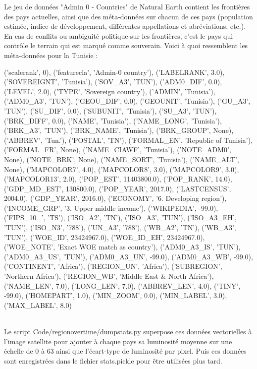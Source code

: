 \documentclass[a4paper]{report}
\begin{document}
Le jeu de données "Admin 0 - Countries" de Natural Earth \cite{naturalearthdata} contient les frontières des pays actuelles, ainsi que des méta-données sur chacun de ces pays (population estimée, indice de développement, différentes appellations et abréviations, etc.). En cas de conflits ou ambiguité politique sur les frontières, c'est le pays qui contrôle le terrain qui est marqué comme souverain. Voici à quoi ressemblent les méta-données pour la Tunisie :\\
\begin{minipage}[t]{1.0\textwidth}
			{('scalerank', 0), ('featurecla', 'Admin-0 country'), ('LABELRANK', 3.0), ('SOVEREIGNT', 'Tunisia'), ('SOV\_A3', 'TUN'), ('ADM0\_DIF', 0.0), ('LEVEL', 2.0), ('TYPE', 'Sovereign country'), ('ADMIN', 'Tunisia'), ('ADM0\_A3', 'TUN'), ('GEOU\_DIF', 0.0), ('GEOUNIT', 'Tunisia'), ('GU\_A3', 'TUN'), ('SU\_DIF', 0.0), ('SUBUNIT', 'Tunisia'), ('SU\_A3', 'TUN'), ('BRK\_DIFF', 0.0), ('NAME', 'Tunisia'), ('NAME\_LONG', 'Tunisia'), ('BRK\_A3', 'TUN'), ('BRK\_NAME', 'Tunisia'), ('BRK\_GROUP', None), ('ABBREV', 'Tun.'), ('POSTAL', 'TN'), ('FORMAL\_EN', 'Republic of Tunisia'), ('FORMAL\_FR', None), ('NAME\_CIAWF', 'Tunisia'), ('NOTE\_ADM0', None), ('NOTE\_BRK', None), ('NAME\_SORT', 'Tunisia'), ('NAME\_ALT', None), ('MAPCOLOR7', 4.0), ('MAPCOLOR8', 3.0), ('MAPCOLOR9', 3.0), ('MAPCOLOR13', 2.0), ('POP\_EST', 11403800.0), ('POP\_RANK', 14.0), ('GDP\_MD\_EST', 130800.0), ('POP\_YEAR', 2017.0), ('LASTCENSUS', 2004.0), ('GDP\_YEAR', 2016.0), ('ECONOMY', '6. Developing region'), ('INCOME\_GRP', '3. Upper middle income'), ('WIKIPEDIA', -99.0), ('FIPS\_10\_', 'TS'), ('ISO\_A2', 'TN'), ('ISO\_A3', 'TUN'), ('ISO\_A3\_EH', 'TUN'), ('ISO\_N3', '788'), ('UN\_A3', '788'), ('WB\_A2', 'TN'), ('WB\_A3', 'TUN'), ('WOE\_ID', 23424967.0), ('WOE\_ID\_EH', 23424967.0), ('WOE\_NOTE', 'Exact WOE match as country'), ('ADM0\_A3\_IS', 'TUN'), ('ADM0\_A3\_US', 'TUN'), ('ADM0\_A3\_UN', -99.0), ('ADM0\_A3\_WB', -99.0),	 ('CONTINENT', 'Africa'), ('REGION\_UN', 'Africa'), ('SUBREGION', 'Northern Africa'), ('REGION\_WB', 'Middle East \& North Africa'), ('NAME\_LEN', 7.0), ('LONG\_LEN', 7.0), ('ABBREV\_LEN', 4.0), ('TINY', -99.0), ('HOMEPART', 1.0), ('MIN\_ZOOM', 0.0), ('MIN\_LABEL', 3.0), ('MAX\_LABEL', 8.0)}
\end{minipage}\\

Le script Code/regionovertime/dumpstats.py superpose ces données vectorielles à l'image satellite pour ajouter à chaque pays sa luminosité moyenne sur une échelle de 0 à 63 ainsi que l'écart-type de luminosité par pixel. Puis ces données sont enregistrées dans le fichier stats.pickle pour être utilisées plus tard.
\end{document}
